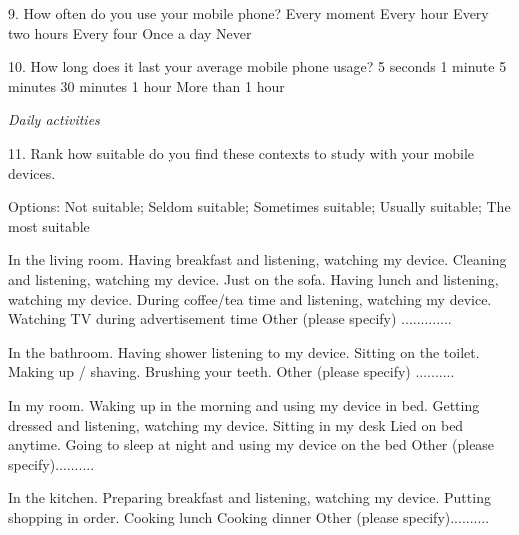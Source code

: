 \begin{small}
9. How often do you use your mobile phone?
\hfill \break {}  Every moment
\hfill \break {}  Every hour
\hfill \break {}  Every two hours
\hfill \break {}  Every four
\hfill \break {}  Once a day
\hfill \break {}  Never

10. How long does it last your average mobile phone usage?
\hfill \break {}  5 seconds
\hfill \break {}  1 minute
\hfill \break {}  5 minutes
\hfill \break {}  30 minutes
\hfill \break {}  1 hour
\hfill \break {}  More than 1 hour


\textit{Daily activities}

11. Rank how suitable do you find these contexts to study with your mobile devices. 

Options: Not suitable; Seldom suitable;	Sometimes suitable; Usually suitable; The most suitable

In the living room.
\hfill \break {}  Having breakfast and listening, watching my device.					
\hfill \break {}  Cleaning and listening, watching my device.					
\hfill \break {}  Just on the sofa.					
\hfill \break {}  Having lunch and listening, watching my device.					
\hfill \break {}  During coffee/tea time and listening, watching my device.					
\hfill \break {}  Watching TV during advertisement time					
\hfill \break {}  Other (please specify) .............

In the bathroom.
\hfill \break {}  Having shower listening to my device.					
\hfill \break {}  Sitting on the toilet.					
\hfill \break {}  Making up / shaving.					
\hfill \break {}  Brushing your teeth.					
\hfill \break {}  Other (please specify) ..........

In my room.
\hfill \break {}  Waking up in the morning and using my device in bed.					
\hfill \break {}  Getting dressed and listening, watching my device.					
\hfill \break {}  Sitting in my desk					
\hfill \break {}  Lied on bed anytime.					
\hfill \break {}  Going to sleep at night and using my device on the bed					
\hfill \break {}  Other (please specify)..........					

In the kitchen.
\hfill \break {}  Preparing breakfast and listening, watching my device.					
\hfill \break {}  Putting shopping in order.					
\hfill \break {}  Cooking lunch					
\hfill \break {}  Cooking dinner					
\hfill \break {}  Other (please specify)..........					


\end{small}

